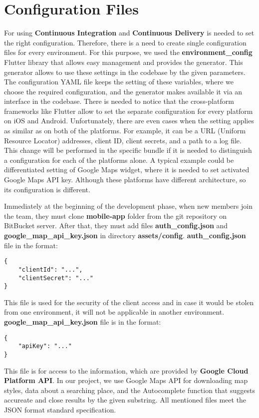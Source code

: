 \newpage
\section{Configuration Files}\label{sec:configuration-files}

For using \textbf{Continuous Integration} and \textbf{Continuous Delivery} is needed to set the right configuration.
Therefore, there is a need to create single configuration files for every environment.
For this purpose, we used the \textbf{environment\_config} Flutter library that allows easy management and provides the generator.
This generator allows to use these settings in the codebase by the given parameters.
The configuration YAML file keeps the setting of these variables, where we choose the required configuration, and the generator makes available it via an interface in the codebase.
There is needed to notice that the cross-platform frameworks like Flutter allow to set the separate configuration for every platform on iOS and Android.
Unfortunately, there are even cases when the setting applies as similar as on both of the platforms.
For example, it can be a URL (Uniform Resource Locator) addresses, client ID, client secrets, and a path to a log file.
This change will be performed in the specific bundle if it is needed to distinguish a configuration for each of the platforms alone.
A typical example could be differentiated setting of Google Maps widget, where it is needed to set activated Google Maps API key.
Although these platforms have different architecture, so its configuration is different.

Immediately at the beginning of the development phase, when new members join the team, they must clone \textbf{mobile-app} folder from the git repository on BitBucket server.
After that, they must add files \textbf{auth\_config.json} and \textbf{google\_map\_api\_key.json} in directory \textbf{assets/config}.
\newline
\newline
\textbf{auth\_config.json} file in the format:
\begin{verbatim}
{
    "clientId": "...",
    "clientSecret": "..."
}
\end{verbatim}
This file is used for the security of the client access and in case it would be stolen from one environment, it will not be applicable in another environment.
\newline
\newline
\textbf{google\_map\_api\_key.json} file is in the format:
\begin{verbatim}
{
    "apiKey": "..."
}
\end{verbatim}
This file is for access to the information, which are provided by \textbf{Google Cloud Platform API}.
In our project, we use Google Maps API for downloading map styles, data about a searching place, and the Autocomplete function that suggests accureate and close results by the given substring.
All mentioned files meet the JSON format standard specification.


